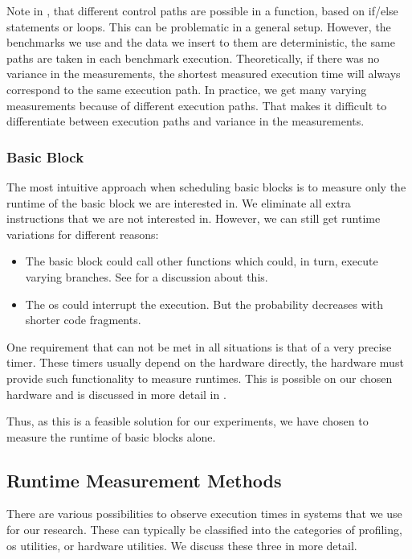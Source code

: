 Note in , that different control paths are possible in a function, based on if/else statements or loops.
This can be problematic in a general setup.
However, the benchmarks we use and the data we insert to them are deterministic, \ie the same paths are taken in each benchmark execution.
Theoretically, if there was no variance in the measurements, the shortest measured execution time will always correspond to the same execution path.
In practice, we get many varying measurements because of different execution paths.
That makes it difficult to differentiate between execution paths and variance in the measurements.

\subsubsection{Basic Block}
The most intuitive approach when scheduling basic blocks is to measure only the runtime of the basic block we are interested in.
We eliminate all extra instructions that we are not interested in.
However, we can still get runtime variations for different reasons:
\begin{itemize}
    \item The basic block could call other functions which could, in turn, execute varying branches. 
          See  for a discussion about this.
    \item The \ac{os} could interrupt the execution. 
          But the probability decreases with shorter code fragments.
\end{itemize}

One requirement that can not be met in all situations is that of a very precise timer.
These timers usually depend on the hardware directly, \ie the hardware must provide such functionality to measure runtimes.
This is possible on our chosen hardware and is discussed in more detail in .

Thus, as this is a feasible solution for our experiments, we have chosen to measure the runtime of basic blocks alone.
    
\subsection{Runtime Measurement Methods}
\label{sec:approach:datageneration:runtime_methods}
There are various possibilities to observe execution times in systems that we use for our research.
These can typically be classified into the categories of profiling, \ac{os} utilities, or hardware utilities.
We discuss these three in more detail.

